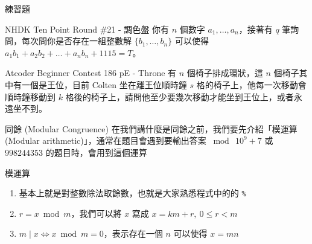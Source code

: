 \documentclass[aspectratio=169]{beamer}
\begin{document}
\begin{frame}{練習題}
    \begin{block}{NHDK Ten Point Round \#21 - 調色盤}
        你有 $n$ 個數字 $a_1, \ldots, a_n$，接著有 $q$ 筆詢問，每次問你是否存在一組整數解 $\{b_1,\ldots,b_n\}$ 可以使得 $a_1b_1 + a_2b_2 + \dots + a_nb_n + 1115 = T$。
    \end{block}
    \begin{block}{Atcoder Beginner Contest 186 pE - Throne}
        有 $n$ 個椅子排成環狀，這 $n$ 個椅子其中有一個是王位，目前 Colten 坐在離王位順時鐘 $s$ 格的椅子上，他每一次移動會順時鐘移動到 $k$ 格後的椅子上，請問他至少要幾次移動才能坐到王位上，或者永遠坐不到。
    \end{block}
\end{frame}

\begin{frame}{同餘 (Modular Congruence)}
    在我們講什麼是同餘之前，我們要先介紹「模運算 (Modular arithmetic)」，通常在題目會遇到要輸出答案 $\bmod \ 10^9+7$ 或 $998244353$ 的題目時，會用到這個運算
    \begin{alertblock}{模運算}
        \begin{enumerate}
            \item 基本上就是對整數除法取餘數，也就是大家熟悉程式中的的 \texttt{\%}
            \item $r = x \bmod m$，我們可以將 $x$ 寫成 $x = km + r, \ 0 \le r < m$ 
            \item $m \mid x \iff x \bmod m = 0$，表示存在一個 $n$ 可以使得 $x = mn$
        \end{enumerate}
    \end{alertblock}
\end{frame}
\end{document}
